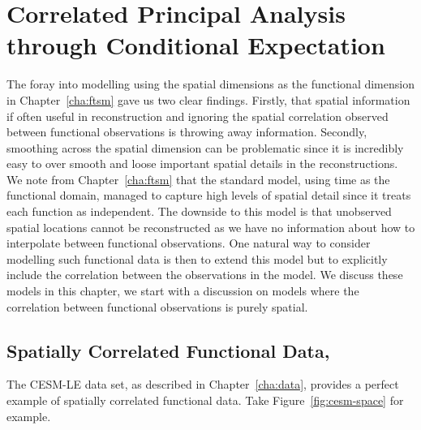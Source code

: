 
\chapter{Correlated Principal Analysis through Conditional Expectation \label{cha:cpace}}  %

\ifpdf
    \graphicspath{{Chapter5/Figs/Raster/}{Chapter5/Figs/PDF/}{Chapter5/Figs/}}
\else
    \graphicspath{{Chapter5/Figs/Vector/}{Chapter5/Figs/}}
\fi

The foray into modelling using the spatial dimensions as the functional dimension in Chapter~\ref{cha:ftsm} gave us two clear findings.
Firstly, that spatial information if often useful in reconstruction and ignoring the spatial correlation observed between functional observations is throwing away information.
Secondly, smoothing across the spatial dimension can be problematic since it is incredibly easy to over smooth and loose important spatial details in the reconstructions. 
We note from Chapter~\ref{cha:ftsm} that the standard model, using time as the functional domain, managed to capture high levels of spatial detail since it treats each function as independent.
The downside to this model is that unobserved spatial locations cannot be reconstructed as we have no information about how to interpolate between functional observations.
One natural way to consider modelling such functional data is then to extend this model but to explicitly include the correlation between the observations in the model. 
We discuss these models in this chapter, we start with a discussion on models where the correlation between functional observations is purely spatial.

\section{Spatially Correlated Functional Data, \label{sec:space}}
The CESM-LE data set, as described in Chapter~\ref{cha:data}, provides a perfect example of spatially correlated functional data.
Take Figure~\ref{fig:cesm-space} for example.

